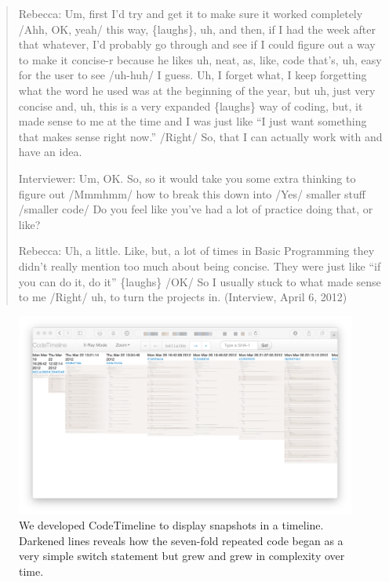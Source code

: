 \begin{quote}
  Rebecca: Um, first I'd try and get it to make sure it worked completely /Ahh, OK, yeah/ this way, \{laughs\}, uh, and then, if I had the week after that whatever, I'd probably go through and see if I could figure out a way to make it concise-r because he likes uh, neat, as, like, code that's, uh, easy for the user to see /uh-huh/ I guess. Uh, I forget what, I keep forgetting what the word he used was at the beginning of the year, but uh, just very concise and, uh, this is a very expanded \{laughs\} way of coding, but, it made sense to me at the time and I was just like ``I just want something that makes sense right now.'' /Right/ So, that I can actually work with and have an idea.

  Interviewer: Um, OK. So, so it would take you some extra thinking to figure out /Mmmhmm/ how to break this down into /Yes/ smaller stuff /smaller code/ Do you feel like you've had a lot of practice doing that, or like?

  Rebecca: Uh, a little. Like, but, a lot of times in Basic Programming they didn't really mention too much about being concise. They were just like ``if you can do it, do it'' \{laughs\} /OK/ So I usually stuck to what made sense to me /Right/ uh, to turn the projects in. (Interview, April 6, 2012)
\end{quote}

\begin{figure}[htbp]
\centering
\includegraphics{media/CodeTimeline.png}
\caption{We developed CodeTimeline to display snapshots in a timeline. Darkened lines reveals how the seven-fold repeated code began as a very simple switch statement but grew and grew in complexity over time.}
\end{figure}

